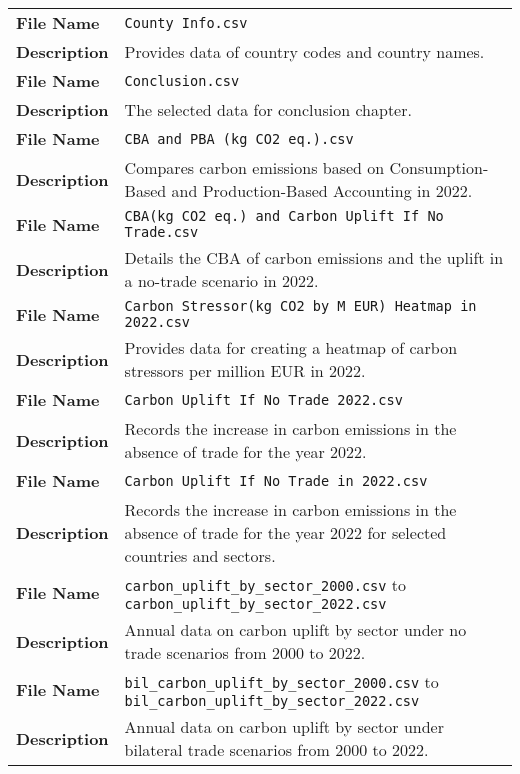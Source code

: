 \begin{appendices}
\begin{longtable}{|p{}|p{}|}
    \hline
    \textbf{File Name} & \texttt{County Info.csv} \\
    \textbf{Description} & Provides data of country codes and country names. \\
    \hline
    \textbf{File Name} & \texttt{Conclusion.csv} \\
    \textbf{Description} & The selected data for conclusion chapter. \\
    \hline
    \textbf{File Name} & \texttt{CBA and PBA (kg CO2 eq.).csv} \\
    \textbf{Description} & Compares carbon emissions based on Consumption-Based and Production-Based Accounting in 2022. \\
    \hline
    \textbf{File Name} & \texttt{CBA(kg CO2 eq.) and Carbon Uplift If No Trade.csv} \\
    \textbf{Description} & Details the CBA of carbon emissions and the uplift in a no-trade scenario in 2022. \\
    \hline
    \textbf{File Name} & \texttt{Carbon Stressor(kg CO2 by M EUR) Heatmap in 2022.csv} \\
    \textbf{Description} & Provides data for creating a heatmap of carbon stressors per million EUR in 2022. \\
    \hline
    \textbf{File Name} & \texttt{Carbon Uplift If No Trade 2022.csv} \\
    \textbf{Description} & Records the increase in carbon emissions in the absence of trade for the year 2022. \\
    \hline
    \textbf{File Name} & \texttt{Carbon Uplift If No Trade in 2022.csv} \\
    \textbf{Description} & Records the increase in carbon emissions in the absence of trade for the year 2022 for selected countries and sectors. \\
    \hline
    \textbf{File Name} & \texttt{carbon\_uplift\_by\_sector\_2000.csv} to \texttt{carbon\_uplift\_by\_sector\_2022.csv} \\
    \textbf{Description} & Annual data on carbon uplift by sector under no trade scenarios from 2000 to 2022. \\
    \hline
    \textbf{File Name} & \texttt{bil\_carbon\_uplift\_by\_sector\_2000.csv} to \texttt{bil\_carbon\_uplift\_by\_sector\_2022.csv} \\
    \textbf{Description} & Annual data on carbon uplift by sector under bilateral trade scenarios from 2000 to 2022. \\

\end{longtable}
\end{appendices}
